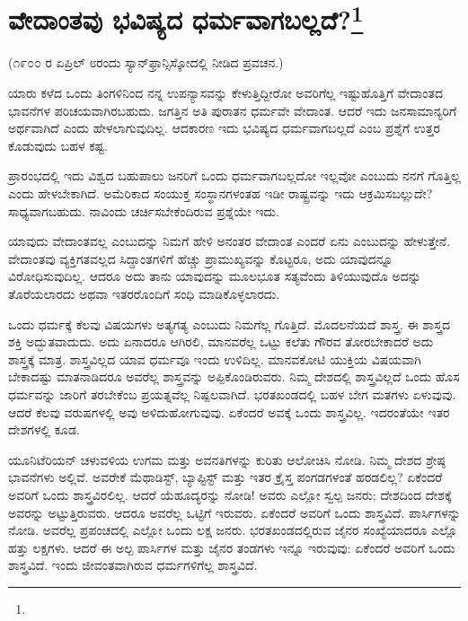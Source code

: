 
\chapter[ವೇದಾಂತವು ಭವಿಷ್ಯದ ಧರ್ಮವಾಗಬಲ್ಲದೆ?]{ವೇದಾಂತವು ಭವಿಷ್ಯದ ಧರ್ಮವಾಗಬಲ್ಲದೆ?\protect\footnote{}}

\begin{center}
(೧೯೦೦ ರ ಏಪ್ರಿಲ್ ೮ರಂದು ಸ್ಯಾನ್‌ಫ್ರಾನ್ಸಿಸ್ಕೋದಲ್ಲಿ ನೀಡಿದ ಪ್ರವಚನ.)
\end{center}

ಯಾರು ಕಳೆದ ಒಂದು ತಿಂಗಳಿನಿಂದ ನನ್ನ ಉಪನ್ಯಾಸವನ್ನು ಕೇಳುತ್ತಿದ್ದೀರೋ ಅವರಿಗೆಲ್ಲ ಇಷ್ಟುಹೊತ್ತಿಗೆ ವೇದಾಂತದ ಭಾವನೆಗಳ ಪರಿಚಯವಾಗಿರಬಹುದು. ಜಗತ್ತಿನ ಅತಿ ಪುರಾತನ ಧರ್ಮವೇ ವೇದಾಂತ. ಆದರೆ ಇದು ಜನಸಾಮಾನ್ಯರಿಗೆ ಅರ್ಥವಾಗಿದೆ ಎಂದು ಹೇಳಲಾಗುವುದಿಲ್ಲ. ಆದಕಾರಣ ಇದು ಭವಿಷ್ಯದ ಧರ್ಮವಾಗಬಲ್ಲದೆ ಎಂಬ ಪ್ರಶ್ನೆಗೆ ಉತ್ತರ ಕೊಡುವುದು ಬಹಳ ಕಷ್ಟ.

ಪ್ರಾರಂಭದಲ್ಲಿ ಇದು ವಿಶ್ವದ ಬಹುಪಾಲು ಜನರಿಗೆ ಒಂದು ಧರ್ಮವಾಗಬಲ್ಲದೋ ಇಲ್ಲವೋ ಎಂಬುದು ನನಗೆ ಗೊತ್ತಿಲ್ಲ ಎಂದು ಹೇಳಬೇಕಾಗಿದೆ. ಅಮೆರಿಕಾದ ಸಂಯುಕ್ತ ಸಂಸ್ಥಾನಗಳಂತಹ ಇಡೀ ರಾಷ್ಟ್ರವನ್ನು ಇದು ಆಕ್ರಮಿಸಬಲ್ಲುದೇ? ಸಾಧ್ಯವಾಗಬಹುದು. ನಾವಿಂದು ಚರ್ಚಿಸಬೇಕೆಂದಿರುವ ಪ್ರಶ್ನೆಯೇ ಇದು.

ಯಾವುದು ವೇದಾಂತವಲ್ಲ ಎಂಬುದನ್ನು ನಿಮಗೆ ಹೇಳಿ ಅನಂತರ ವೇದಾಂತ ಎಂದರೆ ಏನು ಎಂಬುದನ್ನು ಹೇಳುತ್ತೇನೆ. ವೇದಾಂತವು ವ್ಯಕ್ತಿಗತವಲ್ಲದ ಸಿದ್ದಾಂತಗಳಿಗೆ ಹೆಚ್ಚು ಪ್ರಾಮುಖ್ಯವನ್ನು ಕೊಟ್ಟರೂ, ಅದು ಯಾವುದನ್ನೂ ವಿರೋಧಿಸುವುದಿಲ್ಲ. ಆದರೂ ಅದು ತಾನು ಯಾವುದನ್ನು ಮೂಲಭೂತ ಸತ್ಯವೆಂದು ತಿಳಿಯುವುದೊ ಅದನ್ನು ತೊರೆಯಲಾರದು ಅಥವಾ ಇತರರೊಂದಿಗೆ ಸಂಧಿ ಮಾಡಿಕೊಳ್ಳಲಾರದು.

ಒಂದು ಧರ್ಮಕ್ಕೆ ಕೆಲವು ವಿಷಯಗಳು ಅತ್ಯಗತ್ಯ ಎಂಬುದು ನಿಮಗೆಲ್ಲ ಗೊತ್ತಿದೆ. ಮೊದಲನೆಯದೆ ಶಾಸ್ತ್ರ. ಈ ಶಾಸ್ತ್ರದ ಶಕ್ತಿ ಅದ್ಭುತವಾದುದು. ಅದು ಏನಾದರೂ ಆಗಿರಲಿ, ಮಾನವರೆಲ್ಲ ಒಟ್ಟು ಕಲೆತು ಗೌರವ ತೋರಬೇಕಾದರೆ ಅದು ಶಾಸ್ತ್ರಕ್ಕೆ ಮಾತ್ರ. ಶಾಸ್ತ್ರವಿಲ್ಲದ ಯಾವ ಧರ್ಮವೂ ಇಂದು ಉಳಿದಿಲ್ಲ. ಮಾನವಕೋಟಿ ಯುಕ್ತಿಯ ವಿಷಯವಾಗಿ ಬೇಕಾದಷ್ಟು ಮಾತನಾಡಿದರೂ ಅವರೆಲ್ಲ ಶಾಸ್ತ್ರವನ್ನು ಅಪ್ಪಿಕೊಂಡಿರುವರು. ನಿಮ್ಮ ದೇಶದಲ್ಲಿ ಶಾಸ್ತ್ರವಿಲ್ಲದೆ ಒಂದು ಹೊಸ ಧರ್ಮವನ್ನು ಜಾರಿಗೆ ತರಬೇಕೆಂಬ ಪ್ರಯತ್ನವೆಲ್ಲ ನಿಷ್ಪಲವಾಗಿದೆ. ಭರತಖಂಡದಲ್ಲಿ ಬಹಳ ಬೇಗ ಮತಗಳು ಏಳುವುವು. ಆದರೆ ಕೆಲವು ವರುಷಗಳಲ್ಲಿ ಅವು ಅಳಿದುಹೋಗುವುವು. ಏಕೆಂದರೆ ಅವಕ್ಕೆ ಒಂದು ಶಾಸ್ತ್ರವಿಲ್ಲ. ಇದರಂತೆಯೇ ಇತರ ದೇಶಗಳಲ್ಲಿ ಕೂಡ.

ಯೂನಿಟೆರಿಯನ್ ಚಳುವಳಿಯ ಉಗಮ ಮತ್ತು ಅವನತಿಗಳನ್ನು ಕುರಿತು ಆಲೋಚಿಸಿ ನೋಡಿ. ನಿಮ್ಮ ದೇಶದ ಶ್ರೇಷ್ಠ ಭಾವನೆಗಳು ಅಲ್ಲಿವೆ. ಅವರೇಕೆ ಮೆಥಾಡಿಸ್ಟ್, ಬ್ಯಾಪ್ಟಿಸ್ಟ್ ಮತ್ತು ಇತರ ಕ್ರೈಸ್ತ ಪಂಗಡಗಳಂತೆ ಹರಡಲಿಲ್ಲ? ಏಕೆಂದರೆ ಅವರಿಗೆ ಒಂದು ಶಾಸ್ತ್ರವಿರಲಿಲ್ಲ. ಆದರೆ ಯೆಹೂದ್ಯರನ್ನು ನೋಡಿ! ಅವರು ಎಲ್ಲೋ ಸ್ವಲ್ಪ ಜನರು; ದೇಶದಿಂದ ದೇಶಕ್ಕೆ ಅವರನ್ನು ಅಟ್ಟುತ್ತಿರುವರು. ಆದರೂ ಅವರೆಲ್ಲ ಒಟ್ಟಿಗೆ ಇರುವರು. ಏಕೆಂದರೆ ಅವರಿಗೆ ಒಂದು ಶಾಸ್ತ್ರವಿದೆ. ಪಾರ್ಸಿಗಳನ್ನು ನೋಡಿ. ಅವರೆಲ್ಲ ಪ್ರಪಂಚದಲ್ಲಿ ಎಲ್ಲೋ ಒಂದು ಲಕ್ಷ ಜನರು. ಭರತಖಂಡದಲ್ಲಿರುವ ಜೈನರ ಸಂಖ್ಯೆಯಾದರೂ ಎಲ್ಲೊ ಹತ್ತು ಲಕ್ಷಗಳು. ಆದರೆ ಈ ಅಲ್ಪ ಪಾರ್ಸಿಗಳ ಮತ್ತು ಜೈನರ ತಂಡಗಳು ಇನ್ನೂ ಇರುವುವು: ಏಕೆಂದರೆ ಅವರಿಗೆ ಒಂದು ಶಾಸ್ತ್ರವಿದೆ. ಇಂದು ಜೀವಂತವಾಗಿರುವ ಧರ್ಮಗಳಿಗೆಲ್ಲ ಶಾಸ್ತ್ರವಿದೆ.

